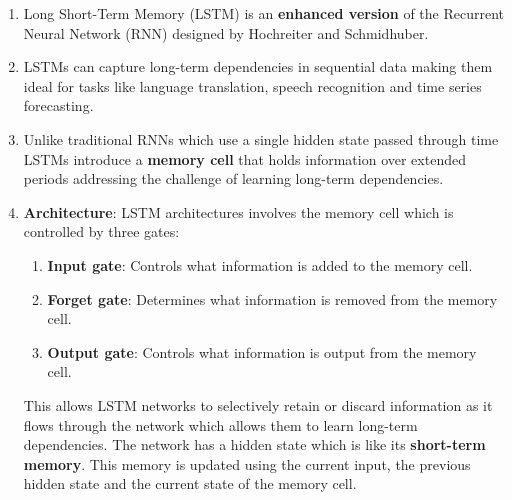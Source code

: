\begin{enumerate}
    \item Long Short-Term Memory (LSTM) is an \textbf{enhanced version} of the Recurrent Neural Network (RNN) designed by Hochreiter and Schmidhuber. 
    \hfill \cite{geeksforgeeks/deep-learning/deep-learning-introduction-to-long-short-term-memory}

    \item LSTMs can capture long-term dependencies in sequential data making them ideal for tasks like language translation, speech recognition and time series forecasting.
    \hfill \cite{geeksforgeeks/deep-learning/deep-learning-introduction-to-long-short-term-memory}

    \item Unlike traditional RNNs which use a single hidden state passed through time LSTMs introduce a \textbf{memory cell} that holds information over extended periods addressing the challenge of learning long-term dependencies.
    \hfill \cite{geeksforgeeks/deep-learning/deep-learning-introduction-to-long-short-term-memory}

    \item \textbf{Architecture}: LSTM architectures involves the memory cell which is controlled by three gates:
    \hfill \cite{geeksforgeeks/deep-learning/deep-learning-introduction-to-long-short-term-memory}
    \begin{enumerate}
        \item \textbf{Input gate}: Controls what information is added to the memory cell.
        \hfill \cite{geeksforgeeks/deep-learning/deep-learning-introduction-to-long-short-term-memory}
    
        \item \textbf{Forget gate}: Determines what information is removed from the memory cell.
        \hfill \cite{geeksforgeeks/deep-learning/deep-learning-introduction-to-long-short-term-memory}
    
        \item \textbf{Output gate}: Controls what information is output from the memory cell.
        \hfill \cite{geeksforgeeks/deep-learning/deep-learning-introduction-to-long-short-term-memory}
    \end{enumerate}
    This allows LSTM networks to selectively retain or discard information as it flows through the network which allows them to learn long-term dependencies. 
    The network has a hidden state which is like its \textbf{short-term memory}. 
    This memory is updated using the current input, the previous hidden state and the current state of the memory cell.
    \hfill \cite{geeksforgeeks/deep-learning/deep-learning-introduction-to-long-short-term-memory}
\end{enumerate}



